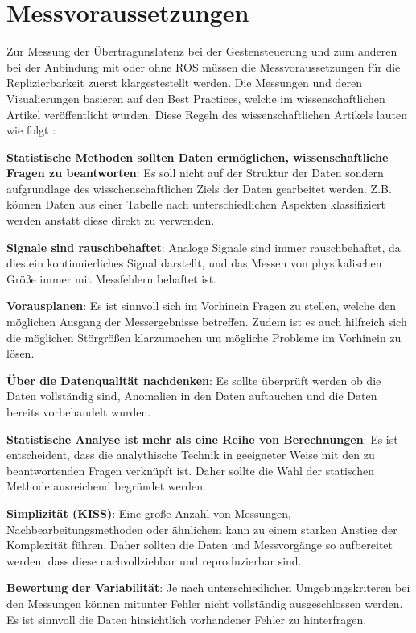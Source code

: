 \section{Messvoraussetzungen}
Zur Messung der Übertragunslatenz bei der Gestensteuerung und zum anderen bei der Anbindung mit oder ohne ROS müssen die Messvoraussetzungen für die Replizierbarkeit zuerst klargestestellt werden. Die Messungen und deren Visualierungen basieren auf den Best Practices, welche im wissenschaftlichen Artikel  veröffentlicht wurden. Diese Regeln des wissenschaftlichen Artikels lauten wie folgt \cite{kass_ten_2016}:
\begin{compact_enumerate}
    \item \textbf{Statistische Methoden sollten Daten ermöglichen, wissenschaftliche Fragen zu beantworten}: Es soll nicht auf der Struktur der Daten sondern aufgrundlage des wisschenschaftlichen Ziels der Daten gearbeitet werden. Z.B. können Daten aus einer Tabelle nach unterschiedlichen Aspekten klassifiziert werden anstatt diese direkt zu verwenden.
    \item \textbf{Signale sind rauschbehaftet}: Analoge Signale sind immer rauschbehaftet, da dies ein kontinuierliches Signal darstellt, und das Messen von physikalischen Größe immer mit Messfehlern behaftet ist.
    \item \textbf{Vorausplanen}: Es ist sinnvoll sich im Vorhinein Fragen zu stellen, welche den möglichen Ausgang der Messergebnisse betreffen. Zudem ist es auch hilfreich sich die möglichen Störgrößen klarzumachen um mögliche Probleme im Vorhinein zu lösen.
    \item \textbf{Über die Datenqualität nachdenken}: Es sollte überprüft werden ob die Daten vollständig sind, Anomalien in den Daten auftauchen und die Daten bereits vorbehandelt wurden.
    \item \textbf{Statistische Analyse ist mehr als eine Reihe von Berechnungen}: Es ist entscheident, dass die analythische Technik in geeigneter Weise mit den zu beantwortenden Fragen verknüpft ist. Daher sollte die Wahl der statischen Methode ausreichend begründet werden.
    \item \textbf{Simplizität (KISS)}: Eine große Anzahl von Messungen, Nachbearbeitungsmethoden oder ähnlichem kann zu einem starken Anstieg der Komplexität führen. Daher sollten die Daten und Messvorgänge so aufbereitet werden, dass diese nachvollziehbar und reproduzierbar sind.
    \item \textbf{Bewertung der Variabilität}: Je nach unterschiedlichen Umgebungskriteren bei den Messungen können mitunter Fehler nicht vollständig ausgeschlossen werden. Es ist sinnvoll die Daten hinsichtlich vorhandener Fehler zu hinterfragen.

\end{compact_enumerate}

